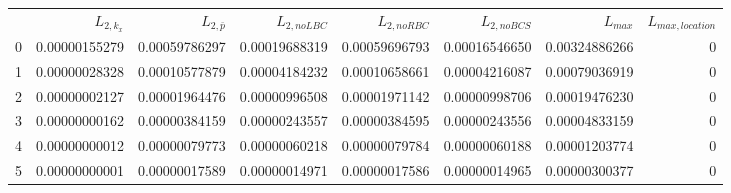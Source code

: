 \begin{tabular}{lrrrrrrr}
 & $L_{2,k_x}$ & $L_{2,\bar{p}}$ & $L_{2,noLBC}$ & $L_{2,noRBC}$ & $L_{2,noBCS}$ & $L_{max}$ & $L_{max,location}$ \\
0 & 0.00000155279 & 0.00059786297 & 0.00019688319 & 0.00059696793 & 0.00016546650 & 0.00324886266 & 0 \\
1 & 0.00000028328 & 0.00010577879 & 0.00004184232 & 0.00010658661 & 0.00004216087 & 0.00079036919 & 0 \\
2 & 0.00000002127 & 0.00001964476 & 0.00000996508 & 0.00001971142 & 0.00000998706 & 0.00019476230 & 0 \\
3 & 0.00000000162 & 0.00000384159 & 0.00000243557 & 0.00000384595 & 0.00000243556 & 0.00004833159 & 0 \\
4 & 0.00000000012 & 0.00000079773 & 0.00000060218 & 0.00000079784 & 0.00000060188 & 0.00001203774 & 0 \\
5 & 0.00000000001 & 0.00000017589 & 0.00000014971 & 0.00000017586 & 0.00000014965 & 0.00000300377 & 0 \\
\end{tabular}

